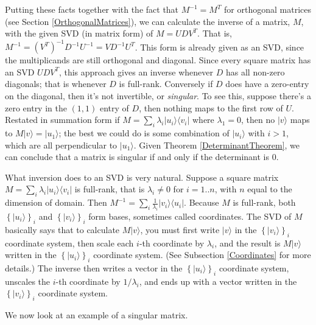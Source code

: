 \documentclass{amsbook}
\begin{document}
Putting these facts together with the fact that $M^{-1}=M^T$ for orthogonal matrices (see Section \ref{OrthogonalMatrices}), we can calculate the inverse of a matrix, $M$, with the given SVD (in matrix form) of $M=UDV^T$.  That is, $M^{-1}=(V^T)^{-1}D^{-1}U^{-1}=VD^{-1}U^T$.  This form is already given as an SVD, since the multiplicands are still orthogonal and diagonal.  Since every square matrix has an SVD $UDV^T$, this approach gives an inverse whenever $D$ has all non-zero diagonals; that is whenever $D$ is full-rank.  Conversely if $D$ does have a zero-entry on the diagonal, then it's not invertible, or {\em singular}.  To see this, suppose there's a zero entry in the $(1, 1)$ entry of $D$, then nothing maps to the first row of $U$.  Restated in summation form if $M=\sum_i\lambda_i|u_i\rangle\langle v_i|$ where $\lambda_1=0$, then no $|v\rangle$ maps to $M|v\rangle=|u_1\rangle$; the best we could do is some combination of $|u_i\rangle$ with $i>1$, which are all perpendicular to $|u_1\rangle$.  Given Theorem \ref{DeterminantTheorem}, we can conclude that a matrix is singular if and only if the determinant is $0$.

What inversion does to an SVD is very natural.  Suppose a square matrix $M=\sum_i\lambda_i|u_i\rangle\langle v_i|$ is full-rank, that is $\lambda_i\neq0$ for $i=1..n$, with $n$ equal to the dimension of domain.  Then $M^{-1}=\sum_i\frac{1}{\lambda_i}|v_i\rangle\langle u_i|$.  Because $M$ is full-rank, both $\left\{|u_i\rangle\right\}_i$ and $\left\{|v_i\rangle\right\}_i$ form bases, sometimes called coordinates.  The SVD of $M$ basically says that to calculate $M|v\rangle$, you must first write $|v\rangle$ in the $\left\{|v_i\rangle\right\}_i$ coordinate system, then scale each $i$-th coordinate by $\lambda_i$, and the result is $M|v\rangle$ written in the $\left\{|u_i\rangle\right\}_i$ coordinate system.  (See Subsection \ref{Coordinates} for more details.)  The inverse then writes a vector in the $\left\{|u_i\rangle\right\}_i$ coordinate system, unscales the $i$-th coordinate by $1/\lambda_i$, and ends up with a vector written in the $\left\{|v_i\rangle\right\}_i$ coordinate system.

We now look at an example of a singular matrix.
\end{document}
